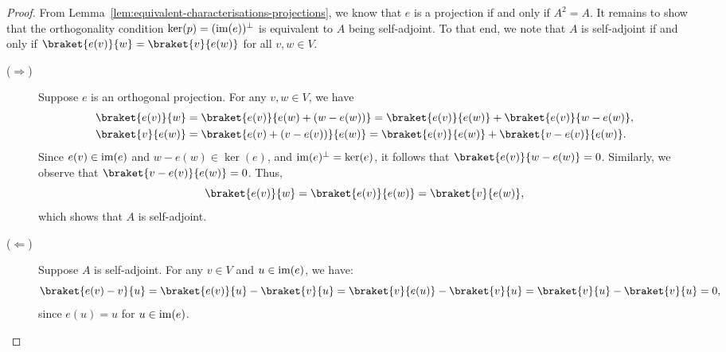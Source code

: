 \documentclass[a4paper, oneside, 12pt]{amsart}
\begin{document}
\begin{proof}
  From Lemma~\ref{lem:equivalent-characterisations-projections}, we know that \( e \) is a projection if and only if \( A^2 = A \).
  It remains to show that the orthogonality condition \( \operatorname{ker}(p) = (\operatorname{im}(e))^\perp \) is equivalent to \( A \) being self-adjoint.
  To that end, we note that \(A\) is self-adjoint if and only if \(\braket{e(v)}{w} = \braket{v}{e(w)}\) for all \(v,w \in V\).

  \begin{description}
    \item[(\( \Rightarrow \))]
    Suppose \( e \) is an orthogonal projection.
    For any \( v, w \in V \), we have
    \begin{align*}
      \braket{e(v)}{w}
      & = \braket{e(v)}{e(w) + (w - e(w))}
        = \braket{e(v)}{e(w)} + \braket{e(v)}{w - e(w)}, \\
      \braket{v}{e(w)}
      & = \braket{e(v) + (v - e(v))}{e(w)}
        = \braket{e(v)}{e(w)} + \braket{v-e(v)}{e(w)}.
    \end{align*}
    Since \( e(v) \in \operatorname{im}(e) \) and \( w - e(w) \in \ker(e) \), and \( \operatorname{im}(e)^{\perp} = \operatorname{ker}(e) \), it follows that \( \braket{e(v)}{w - e(w)} = 0 \).
    Similarly, we observe that \(\braket{v- e(v)}{e(w)} = 0\).
    Thus,
    \begin{equation*}
      \braket{e(v)}{w} = \braket{e(v)}{e(w)} = \braket{v}{e(w)},
    \end{equation*}
    which shows that \( A \) is self-adjoint.

    \item[(\( \Leftarrow \))]
    Suppose \( A \) is self-adjoint.
    For any \( v \in V \) and \( u \in \operatorname{im}(e) \), we have:
    \begin{equation*}
      \braket{e(v) - v}{u}
      = \braket{e(v)}{u} - \braket{v}{u}
      = \braket{v}{e(u)} - \braket{v}{u}
      = \braket{v}{u} - \braket{v}{u}
      = 0,
    \end{equation*}
    since \( e(u) = u \) for \( u \in \operatorname{im}(e) \).\qedhere
  \end{description}
\end{proof}
\end{document}
